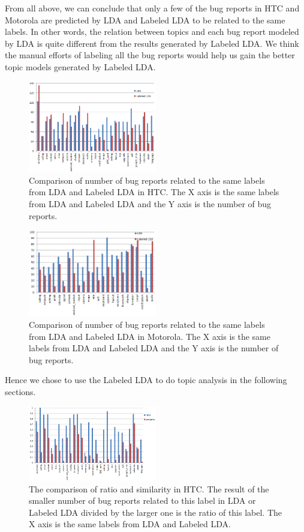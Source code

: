 \documentclass[10pt, conference, compsocconf]{IEEEtran}
\begin{document}
From all above, we can conclude that only a few of the bug reports in HTC and Motorola are predicted by LDA and Labeled LDA to be related to the same labels. In other words, the relation between topics and each bug report modeled by LDA is quite different from the results generated by Labeled LDA. We think the manual efforts of labeling all the bug reports would help us gain the better topic models generated by Labeled LDA. 
\begin{figure}[htb]
\centering
\includegraphics[width=0.5\textwidth]{htcldallda.png}
\caption{Comparison of number of bug reports related to the same labels from LDA and Labeled LDA in HTC. The X axis is the same labels from LDA and Labeled LDA and the Y axis is the number of bug reports.}
\label{bughtc}
\end{figure}
\begin{figure}[!htb]
\centering
\includegraphics[width=0.5\textwidth]{motoldallda.png}
\caption{Comparison of number of bug reports related to the same labels from LDA and Labeled LDA in Motorola. The X axis is the same labels from LDA and Labeled LDA and the Y axis is the number of bug reports.}
\label{bugmoto}
\end{figure}
Hence we chose to use the Labeled LDA to do topic analysis in the following sections.

\begin{figure}[htb]
\centering
\includegraphics[width=0.5\textwidth]{htcratiosim.png}
\caption{The comparison of ratio and similarity in HTC. The result of the smaller number of bug reports related to this label in LDA or Labeled LDA divided by the larger one is the ratio of this label. The X axis is the same labels from LDA and Labeled LDA.}
\end{figure}
\end{document}
